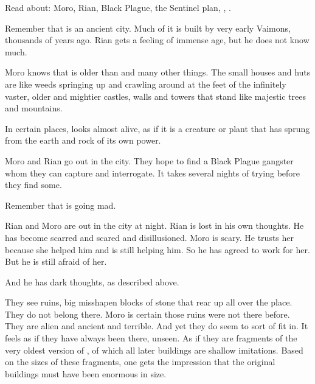
Read about: Moro, Rian, Black Plague, the Sentinel plan, \Malcur, .

Remember that \Malcur is an ancient city.
Much of it is built by very early Vaimons, thousands of years ago. 
Rian gets a feeling of immense age, but he does not know much. 

Moro knows that \Malcur is older than \Yormis and many other things. 
The small houses and huts are like weeds springing up and crawling around at the feet of the infinitely vaster, older and mightier castles, walls and towers that stand like majestic trees and mountains. 

In certain places, \Malcur looks almost alive, as if it is a creature or plant that has sprung from the earth and rock of its own power. 



\begin{comment}
  \section{Out in the city}
\end{comment}

Moro and Rian go out in the city.
They hope to find a Black Plague gangster whom they can capture and interrogate.
It takes several nights of trying before they find some. 

Remember that \Malcur is going mad. 

Rian and Moro are out in the city at night. 
Rian is lost in his own thoughts. 
He has become scarred and scared and disillusioned.
Moro is scary.
He trusts her because she helped him and is still helping him.
So he has agreed to work for her.
But he is still afraid of her. 

And he has dark thoughts, as described above. 

They see ruins, big misshapen blocks of stone that rear up all over the place. 
They do not belong there. 
Moro is certain those ruins were not there before. 
They are alien and ancient and terrible.
And yet they do seem to sort of fit in.
It feels as if they have always been there, unseen.
As if they are fragments of the very oldest version of \Malcur, of which all later buildings are shallow imitations. 
Based on the sizes of these fragments, one gets the impression that the original buildings must have been enormous in size.

\begin{comment}
  \section{Finding a victim}
\end{comment}


